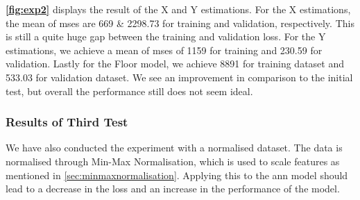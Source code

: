 \textbf{\autoref{fig:exp2}} displays the result of the X and Y estimations. For the X estimations, the mean of \gls{mse}s are 669 \& 2298.73 for training and validation, respectively. This is still a quite huge gap between the training and validation loss. For the Y estimations, we achieve a mean of \gls{mse}s of 1159 for training and 230.59 for validation.  Lastly for the Floor model, we achieve 8891 for training dataset and 533.03 for validation dataset. We see an improvement in comparison to the initial test, but overall the performance still does not seem ideal.


\subsubsection{Results of Third Test}
We have also conducted the experiment with a normalised dataset. The data is normalised through Min-Max Normalisation, which is used to scale features as mentioned in \autoref{sec:minmaxnormalisation}. Applying this to the \gls{ann} model should lead to a decrease in the loss and an increase in the performance of the model.

